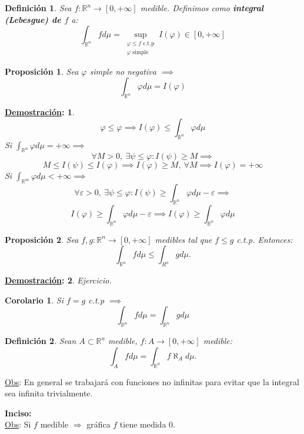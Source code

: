 \documentclass[10pt,a4paper,openright]{book}
\theoremstyle{break}
\newtheorem*{defi}{Definición}
\newtheorem*{coro}{Corolario}
\newtheorem*{prop}{Proposición}
\newtheorem*{demo}{\underline{Demostración}:}
\begin{document}
\begin{defi}
Sea $f: \mathbb{R}^n \to \left[0, +\infty\right]$ medible. Definimos como \textbf{integral (Lebesgue) de $f$} a:
$$\int_{\mathbb{R}^n}f d\mu = \sup_{\substack{\varphi \le f \text{ c.t.p} \\ \varphi \text{ simple}}} I\left(\varphi\right) \in \left[0, +\infty\right]$$
\end{defi}

\begin{prop}
Sea $\varphi$ simple no negativa $\implies$
$$\int_{\mathbb{R}^n}\varphi d \mu = I\left(\varphi\right)$$
\end{prop}
\begin{demo}
$$\varphi \le \varphi \implies I\left(\varphi\right) \le \int_{\mathbb{R}^n} \varphi d \mu$$
Si $\int_{\mathbb{R}^n} \varphi d \mu = +\infty \implies$
$$\forall M > 0,\ \exists \psi \le \varphi: I\left(\psi\right) \ge M \implies$$
$$M \le I\left(\psi\right) \le I\left(\varphi\right) \implies I\left(\varphi\right) \ge M,\ \forall M \implies I\left(\varphi\right) = +\infty$$
Si $\int_{\mathbb{R}^m}\varphi d \mu < +\infty \implies$
$$\forall \varepsilon > 0,\ \exists \psi \le \varphi: I\left(\psi\right) \ge \int_{\mathbb{R}^n}\varphi d \mu - \varepsilon \implies$$
$$I\left(\varphi\right) \ge \int_{\mathbb{R}^n}\varphi d \mu - \varepsilon \implies I\left(\varphi\right) \ge \int_{\mathbb{R}^n}\varphi d \mu$$
\end{demo}

\begin{prop}
Sea $f, g: \mathbb{R}^n \to \left[0, +\infty\right]$ medibles tal que $f \le g$ c.t.p. Entonces:
$$\int_{\mathbb{R}^n}f d \mu \le \int_{R^n}g d \mu.$$
\end{prop}
\begin{demo}
Ejercicio.
\end{demo}

\begin{coro}
Si $f = g$ c.t.p $\implies$
$$\int_{\mathbb{R}^n}f d \mu = \int_{\mathbb{R}^n}g d \mu$$
\end{coro}

\begin{defi}
Sean $A \subset \mathbb{R}^n$ medible, $f: A \to \left[0, +\infty\right]$ medible:
$$\int_A f d \mu = \int_{\mathbb{R}^n}f \aleph_{A} d \mu.$$
\end{defi}
\underline{Obs}:
En general se trabajará con funciones no infinitas para evitar que la integral sea infinita trivialmente.

\textbf{Inciso:}\\ 
\underline{Obs}:
Si $f$ medible $\Rightarrow$ gráfica $f$ tiene medida $0$.
\end{document}
